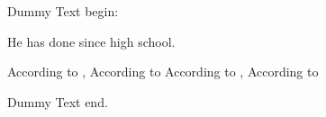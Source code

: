 Dummy Text begin:

He \fullName has done \descriptions since high school.

According to \IMT, According to \IMT According to \IMT, According to

Dummy Text end.